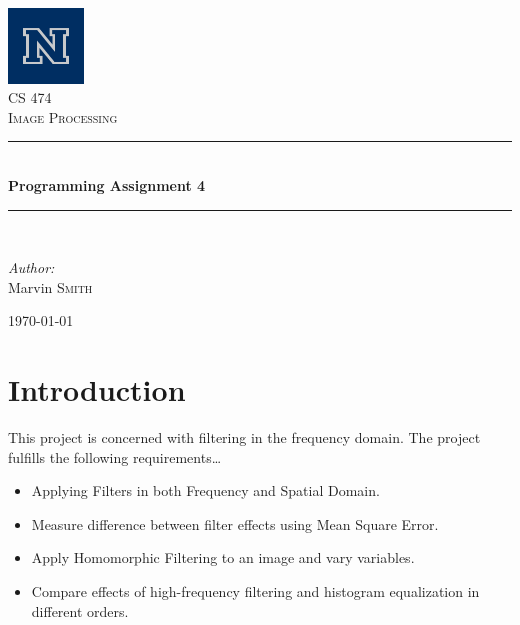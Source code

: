 \documentclass[10pt]{report}
\newcommand{\HRule}{\rule{\linewidth}{0.5mm}}
\begin{document}
\begin{titlepage}
\begin{center}
\includegraphics[width=0.15\textwidth]{logo.jpg}\\[2cm]    
\textsc{\LARGE CS 474}\\[1.5cm]

\textsc{\Large Image Processing}\\[0.5cm]


\HRule \\[0.4cm]
{ \huge \bfseries Programming Assignment 4}\\[0.4cm]

\HRule \\[1.5cm]

\begin{minipage}{0.4\textwidth}
\begin{center} \large
\emph{Author:}\\
Marvin \textsc{Smith}
\end{center}
\end{minipage}
\vfill
{\large \today}
\end{center}
\end{titlepage}
\newpage

\section*{Introduction}

This project is concerned with filtering in the frequency domain.
The project fulfills the following requirements\ldots\\
\begin{itemize}
\item Applying Filters in both Frequency and Spatial Domain.
\item Measure difference between filter effects using Mean Square Error.
\item Apply Homomorphic Filtering to an image and vary variables.
\item Compare effects of high-frequency filtering and histogram equalization in different orders. 
\end{itemize}
\end{document}
